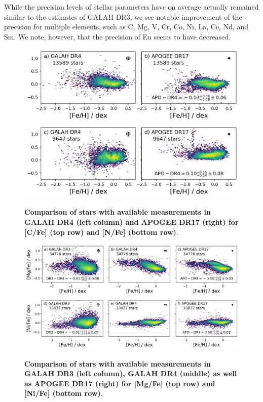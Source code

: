 \documentclass[
  journal=pasa,
  manuscript=research-paper, %
  year=2024,
  volume=37
]{cup-journal}
\begin{document}
While the precision levels of stellar parameters have on average actually remained similar to the estimates of GALAH DR3, we see notable improvement of the precision for multiple elements, such as C, Mg, V, Cr, Co, Ni, La, Ce, Nd, and Sm. We note, however, that the precision of Eu seems to have decreased.

\begin{figure}[ht]
 \centering
 \includegraphics[width=\textwidth]{figures/comparison_dr4_apo17_C_fe.png}
 \includegraphics[width=\textwidth]{figures/comparison_dr4_apo17_N_fe.png}
 \caption{\textbf{Comparison of stars with available measurements in GALAH DR4 (left column) and APOGEE DR17 (right) for [C/Fe] (top row) and [N/Fe] (bottom row)}.}
 \label{fig:comparison_dr4_apo17}
\end{figure}

\begin{figure}[ht]
 \centering
 \includegraphics[width=\textwidth]{figures/comparison_dr4_dr3_apo17_Mg_fe.png}
 \includegraphics[width=\textwidth]{figures/comparison_dr4_dr3_apo17_Ni_fe.png}
 \caption{\textbf{Comparison of stars with available measurements in GALAH DR3 (left column), GALAH DR4 (middle) as well as APOGEE DR17 (right) for [Mg/Fe] (top row) and [Ni/Fe] (bottom row)}.}
 \label{fig:comparison_dr4_dr3_apo17}
\end{figure}
\end{document}
